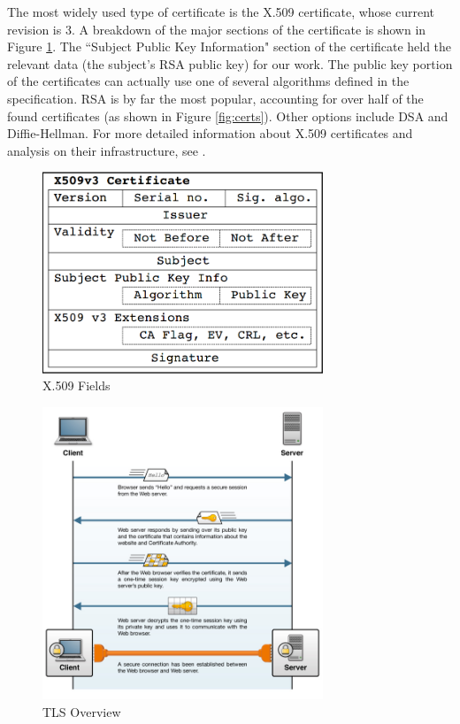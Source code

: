 \documentclass{acm_proc_article-sp}
\begin{document}
The most widely used type of certificate is the X.509 certificate, whose current
revision is 3. A breakdown of the major sections of the certificate is shown in
Figure \ref{fig:x509}. The ``Subject Public Key Information" section of the
certificate held the relevant data (the subject's RSA public key) for our work.
The public key portion of the certificates can actually use one of several
algorithms defined in the specification. RSA is by far the most popular,
accounting for over half of the found certificates (as shown in Figure
\ref{fig:certs}). Other options include DSA and Diffie-Hellman. For more
detailed information about X.509 certificates and analysis on their
infrastructure, see \cite{holz2011ssl}.

\begin{figure}
   \centering
   \includegraphics[width=3.3in]{x509.png}
   \caption{X.509 Fields\cite{holz2011ssl}}
   \label{fig:x509}
\end{figure}

\begin{figure}
   \centering
   \includegraphics[width=3.3in]{tls.jpg}
   \caption{TLS Overview\cite{tlsconcepts}}
   \label{fig:tls}
\end{figure}
\end{document}
